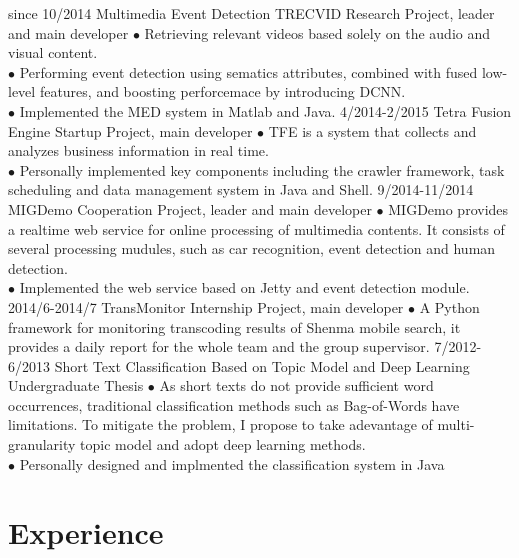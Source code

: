 \documentclass[]{friggeri-cv}
\begin{document}
\begin{entrylist}
  \entry
    {since 10/2014}
    {Multimedia Event Detection}
    {TRECVID Research Project, leader and main developer}
    {$\bullet$ Retrieving relevant videos based solely on the audio and visual content. \\
    $\bullet$ Performing event detection using sematics attributes, combined with fused low-level features, and boosting perforcemace by introducing DCNN. \\
    $\bullet$ Implemented the MED system in Matlab and Java.}
  \entry
    {4/2014-2/2015}
    {Tetra Fusion Engine}
    {Startup Project, main developer}
    {$\bullet$ TFE is a system that collects and analyzes business information in real time. \\
    $\bullet$ Personally implemented key components including the crawler framework, task scheduling and data management system in Java and Shell.}
  \entry
    {9/2014-11/2014}
    {MIGDemo}
    {Cooperation Project, leader and main developer}
    {$\bullet$ MIGDemo provides a realtime web service for online processing of multimedia contents. It consists of several processing mudules, such as car recognition, event detection and human detection.\\
    $\bullet$ Implemented the web service based on Jetty and event detection module.}
  \entry
    {2014/6-2014/7}
    {TransMonitor}
    {Internship Project, main developer}
    {$\bullet$ A Python framework for monitoring transcoding results of Shenma mobile search, it provides a daily report for the whole team and the group supervisor.}
  \entry
    {7/2012-6/2013}
    {Short Text Classification Based on Topic Model and Deep Learning \\ }
    {Undergraduate Thesis}
    {$\bullet$ As short texts do not provide sufficient word occurrences, traditional classification methods such as Bag-of-Words have limitations. 
    To mitigate the problem, I propose to take adevantage of multi-granularity topic model and adopt deep learning methods. \\
    $\bullet$ Personally designed and implmented the classification system in Java}
\end{entrylist}

\section{Experience}
\end{document}
